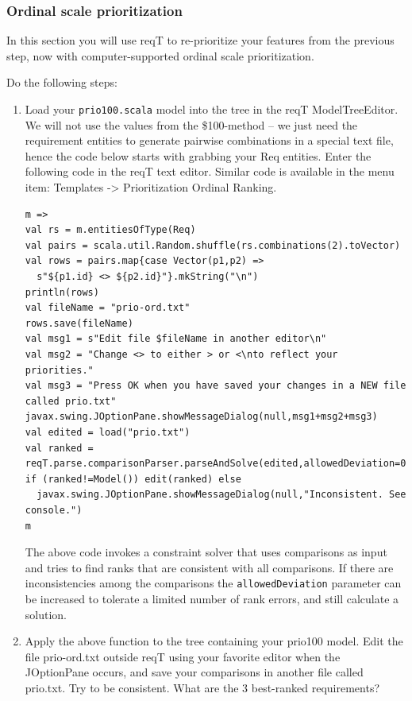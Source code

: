 \documentclass[11pt]{article}
\begin{document}
\begin{framed}
\end{framed}
\newpage\clearpage
\subsubsection{Ordinal scale prioritization}

In this section you will use reqT to re-prioritize your features from the previous step, now with computer-supported ordinal scale prioritization. 
\begin{framed}
\noindent Do the following steps: 

\begin{enumerate}
\item Load your \verb+prio100.scala+ model into the tree in the reqT ModelTreeEditor. We will not use the values from the \$100-method -- we just need the requirement entities to generate pairwise combinations in a special text file, hence the code below starts with grabbing your Req entities. Enter the following code in the reqT text editor. Similar code is available in the menu item:  Templates -> Prioritization Ordinal Ranking.
\begin{lstlisting}
m => 
val rs = m.entitiesOfType(Req)
val pairs = scala.util.Random.shuffle(rs.combinations(2).toVector)
val rows = pairs.map{case Vector(p1,p2) => 
  s"${p1.id} <> ${p2.id}"}.mkString("\n")
println(rows)
val fileName = "prio-ord.txt"
rows.save(fileName)
val msg1 = s"Edit file $fileName in another editor\n"
val msg2 = "Change <> to either > or <\nto reflect your priorities."
val msg3 = "Press OK when you have saved your changes in a NEW file called prio.txt"
javax.swing.JOptionPane.showMessageDialog(null,msg1+msg2+msg3)
val edited = load("prio.txt")
val ranked = reqT.parse.comparisonParser.parseAndSolve(edited,allowedDeviation=0)
if (ranked!=Model()) edit(ranked) else 
  javax.swing.JOptionPane.showMessageDialog(null,"Inconsistent. See console.")
m
\end{lstlisting}
The above code invokes a constraint solver that uses comparisons as input and tries to find ranks that are consistent with all comparisons. If there are inconsistencies among the comparisons the  \verb+allowedDeviation+ parameter can be increased to tolerate a limited number of rank errors, and still calculate a solution.
\item Apply the above function to the tree containing your prio100 model. Edit the file prio-ord.txt outside reqT using your favorite editor when the JOptionPane occurs, and save your comparisons in another file called prio.txt. Try to be consistent. What are the 3 best-ranked requirements?

\end{enumerate}
\end{framed}
\end{document}
